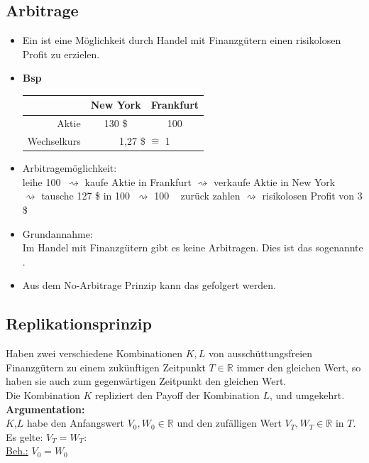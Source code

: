 \subsection{Arbitrage} %
\label{sub:arbitrage}
\begin{itemize}
	\item Ein  ist eine Möglichkeit durch Handel mit Finanzgütern einen risikolosen Profit zu erzielen.
	\item \textbf{Bsp} \\
	\begin{tabular}{r | c c}
		& New York & Frankfurt \\
		\hline
		Aktie & 130 \$ & 100 \texteuro \\
		Wechselkurs & \multicolumn{2}{c}{1,27 \$ $\mathrel{\hat=}$ 1 \texteuro } \\
	\end{tabular}
	\item Arbitragemöglichkeit: \\
	leihe 100 \texteuro $~\rightsquigarrow$ kaufe Aktie in Frankfurt $\rightsquigarrow$ verkaufe Aktie in New York\\ $\rightsquigarrow$ tausche 127 \$ in 100 \texteuro  $~\rightsquigarrow$ 100 \texteuro~  zurück zahlen $\rightsquigarrow$ risikolosen Profit von 3 \$
	\item Grundannahme: \\
		Im Handel mit Finanzgütern gibt es keine Arbitragen. Dies ist das sogenannte . 
	\item Aus dem No-Arbitrage Prinzip kann das  gefolgert werden.	
\end{itemize}

\subsection{Replikationsprinzip}
\label{sub: replikationsprinzip}
Haben zwei verschiedene Kombinationen $K,L$ von ausschüttungsfreien Finanzgütern zu einem zukünftigen Zeitpunkt $T \in \mathds{R}$ immer den gleichen Wert, so haben sie auch zum gegenwärtigen Zeitpunkt den gleichen Wert. \\
Die Kombination $K$ repliziert den Payoff der Kombination $L$, und umgekehrt.\\
\textbf{Argumentation:}\\
$K$,$L$ habe den Anfangswert $V_0,W_0 \in \mathds{R}$ und den zufälligen Wert $V_T,W_T \in \mathds{R}$ in $T$. \\
Es gelte: $V_T = W_T$: \\
\underline{Beh.:} $V_0 = W_0$ \\

